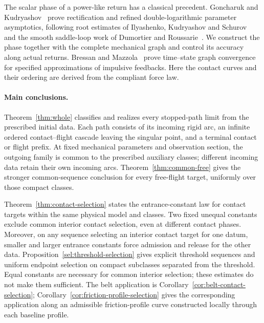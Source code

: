 The scalar phase of a power-like return has a classical precedent.
Goncharuk and Kudryashov~\cite[Lemmas~5--6]{GK2019} prove
rectification and refined double-logarithmic parameter asymptotics,
following root estimates of Ilyashenko, Kudryashov and
Schurov~\cite[Sections~4.5--4.6]{IKS2018} and the smooth saddle-loop
work of Dumortier and Roussarie~\cite{DR1990}. We construct the
phase together with the complete mechanical graph and control its
accuracy along actual returns. Bressan and
Mazzola~\cite[Theorem~2]{BM2013} prove time--state graph convergence
for specified approximations of impulsive feedbacks. Here the
contact curves and their ordering are derived from the compliant
force law.

\paragraph{Main conclusions.}
Theorem~\ref{thm:whole} classifies and realizes every stopped-path
limit from the prescribed initial data. Each path consists of its
incoming rigid arc, an infinite ordered contact--flight cascade
leaving the singular point, and a terminal contact or flight prefix.
At fixed mechanical parameters and observation section, the outgoing
family is common to the prescribed auxiliary classes; different
incoming data retain their own incoming arcs.
Theorem~\ref{thm:common-free} gives the stronger common-sequence
conclusion for every free-flight target, uniformly over those compact
classes.

Theorem~\ref{thm:contact-selection} states the entrance-constant law
for contact targets within the same physical model and classes.
Two fixed unequal constants exclude common interior contact selection,
even at different contact phases. Moreover, on any sequence selecting
an interior contact target for one datum, smaller and larger entrance
constants force admission and release for the other data.
Proposition~\ref{sel:threshold-selection} gives explicit threshold
sequences and uniform endpoint selection on compact subclasses
separated from the threshold. Equal constants are necessary for
common interior selection; these estimates do not make them
sufficient. The belt application is
Corollary~\ref{cor:belt-contact-selection};
Corollary~\ref{cor:friction-profile-selection} gives the corresponding
application along an admissible friction-profile curve constructed
locally through each baseline profile.

